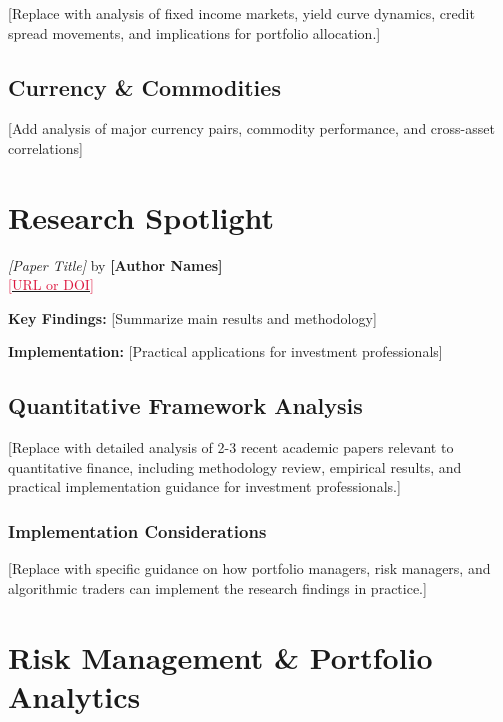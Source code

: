 \documentclass[11pt,a4paper]{article}
\newcommand{\researchcite}[3]{%
    \textit{#1} by \textbf{#2}\\
    \href{#3}{\textcolor{crimson}{\footnotesize #3}}
}
\begin{document}
[Replace with analysis of fixed income markets, yield curve dynamics, credit spread movements, and implications for portfolio allocation.]

\subsection{Currency \& Commodities}

[Add analysis of major currency pairs, commodity performance, and cross-asset correlations]

\section{Research Spotlight}

\begin{research}
\researchcite{[Paper Title]}{[Author Names]}{[URL or DOI]}

\textbf{Key Findings:} [Summarize main results and methodology]

\textbf{Implementation:} [Practical applications for investment professionals]
\end{research}

\subsection{Quantitative Framework Analysis}

[Replace with detailed analysis of 2-3 recent academic papers relevant to quantitative finance, including methodology review, empirical results, and practical implementation guidance for investment professionals.]

\subsubsection{Implementation Considerations}

[Replace with specific guidance on how portfolio managers, risk managers, and algorithmic traders can implement the research findings in practice.]

\section{Risk Management \& Portfolio Analytics}
\end{document}
